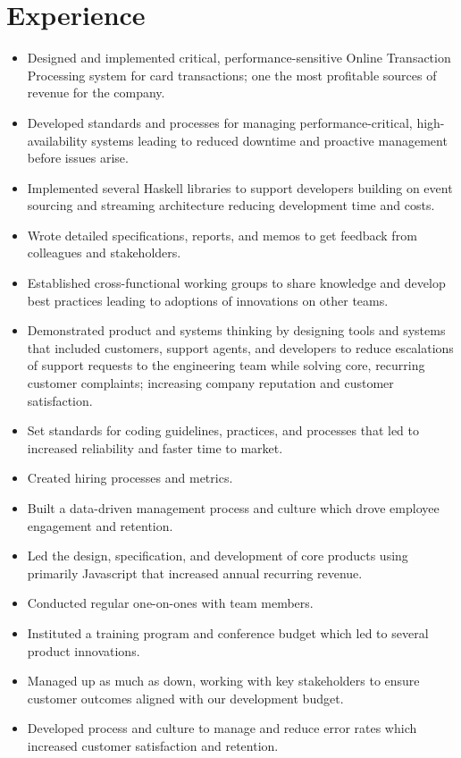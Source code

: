 \documentclass[11pt,a4paper,sans]{moderncv}   %
\begin{document}
\section{Experience}
{\begin{itemize}%
  \item Designed and implemented critical, performance-sensitive
    Online Transaction Processing system for card transactions; one
    the most profitable sources of revenue for the company.
  \item Developed standards and processes for managing
    performance-critical, high-availability systems leading to reduced
    downtime and proactive management before issues arise.
  \item Implemented several Haskell libraries to support developers
    building on event sourcing and streaming architecture reducing
    development time and costs.
  \item Wrote detailed specifications, reports, and memos to get
    feedback from colleagues and stakeholders.
  \item Established cross-functional working groups to share knowledge
    and develop best practices leading to adoptions of innovations on
    other teams.
  \item Demonstrated product and systems thinking by designing tools
    and systems that included customers, support agents, and
    developers to reduce escalations of support requests to the
    engineering team while solving core, recurring customer
    complaints; increasing company reputation and customer
    satisfaction.
\end{itemize}}
{\begin{itemize}%
  \item Set standards for coding guidelines, practices, and processes
    that led to increased reliability and faster time to market.
  \item Created hiring processes and metrics.
  \item Built a data-driven management process and culture which drove
    employee engagement and retention.
  \item Led the design, specification, and development of core
    products using primarily Javascript that increased annual
    recurring revenue.
  \item Conducted regular one-on-ones with team members.
  \item Instituted a training program and conference budget which led
    to several product innovations.
  \item Managed up as much as down, working with key stakeholders to
    ensure customer outcomes aligned with our development budget.
  \item Developed process and culture to manage and reduce error rates
    which increased customer satisfaction and retention.
\end{itemize}}
\end{document}
